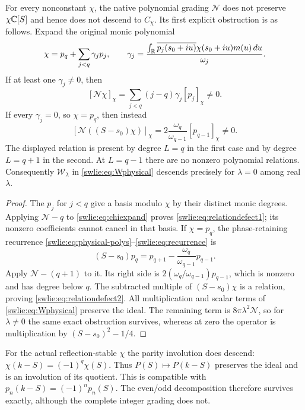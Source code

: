 \documentclass[11pt]{article}
\begin{document}
\begin{swlietheorem}\label{swlie:thm:descent}
For every nonconstant $\chi$, the native polynomial grading
$\mathcal N$ does not preserve $\chi\mathbb C[S]$ and hence
does not descend to $C_\chi$. Its first explicit obstruction
is as follows. Expand the original monic polynomial
\begin{equation}\label{swlie:eq:chiexpand}
 \chi=p_q+\sum_{j<q}\gamma_jp_j,\qquad
 \gamma_j=\frac{\int_\mathbb R\overline{p_j(s_0+iu)}
                \chi(s_0+iu)m(u)\,du}{\omega_j}.
\end{equation}
If at least one $\gamma_j\ne0$, then
\begin{equation}\label{swlie:eq:relationdefect1}
 [\mathcal N\chi]_\chi
       =\sum_{j<q}(j-q)\gamma_j[p_j]_\chi\ne0.
\end{equation}
If every $\gamma_j=0$, so $\chi=p_q$, then instead
\begin{equation}\label{swlie:eq:relationdefect2}
 [\mathcal N((S-s_0)\chi)]_\chi
       =2\frac{\omega_q}{\omega_{q-1}}[p_{q-1}]_\chi\ne0.
\end{equation}
The displayed relation is present by degree $L=q$ in the
first case and by degree $L=q+1$ in the second.
At $L=q-1$ there are no nonzero polynomial relations.
Consequently $\mathcal W_\lambda$ in
\eqref{swlie:eq:Wphysical} descends precisely for $\lambda=0$
among real $\lambda$.
\end{swlietheorem}
\begin{proof}
The $p_j$ for $j<q$ give a basis modulo $\chi$ by their
distinct monic degrees. Applying $\mathcal N-q$ to
\eqref{swlie:eq:chiexpand} proves \eqref{swlie:eq:relationdefect1};
its nonzero coefficients cannot cancel in that basis.
If $\chi=p_q$, the phase-retaining recurrence
\eqref{swlie:eq:physical-polys}--\eqref{swlie:eq:recurrence} is
\[
 (S-s_0)p_q=p_{q+1}
                 -\frac{\omega_q}{\omega_{q-1}}p_{q-1}.
\]
Apply $\mathcal N-(q+1)$ to it. Its right side is
$2(\omega_q/\omega_{q-1})p_{q-1}$, which is nonzero
and has degree below $q$. The subtracted multiple
of $(S-s_0)\chi$ is a relation, proving
\eqref{swlie:eq:relationdefect2}.
All multiplication and scalar terms of
\eqref{swlie:eq:Wphysical} preserve the ideal. The remaining
term is $8\pi\lambda^2\mathcal N$, so for $\lambda\ne0$
the same exact obstruction survives, whereas at zero
the operator is multiplication by $(S-s_0)^2-1/4$.
\end{proof}

For the actual reflection-stable $\chi$ the parity
involution does descend: $\chi(k-S)=(-1)^q\chi(S)$.
Thus $P(S)\mapsto P(k-S)$ preserves the ideal and is
an involution of its quotient. This is compatible
with $p_n(k-S)=(-1)^np_n(S)$.
The even/odd decomposition therefore survives exactly,
although the complete integer grading does not.
\end{document}
